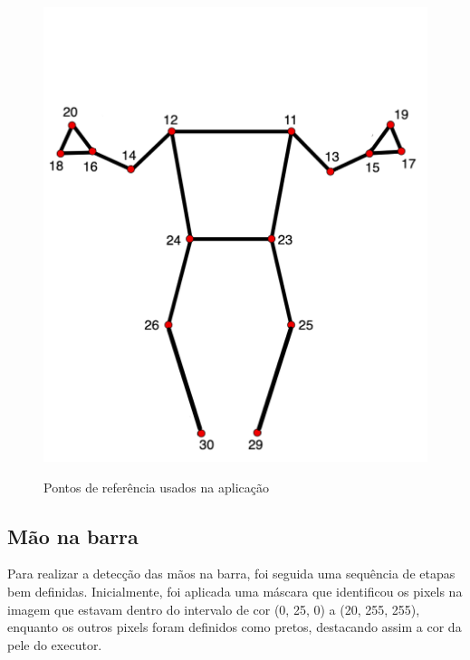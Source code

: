 \begin{figure}[H]
	\centering
	\caption{Pontos de referência usados na aplicação}
	\includegraphics[scale=0.2]{figuras/eph/pose_landmarks_custom.png}
	\label{fig:Pontos de referencia usados na aplicacao}
\end{figure}

\subsection[Mão na barra]{Mão na barra}\label{sec:Mao na barra}


Para realizar a detecção das mãos na barra, foi seguida uma sequência de etapas bem definidas. Inicialmente, foi aplicada uma máscara que identificou os pixels na imagem que estavam dentro do intervalo de cor (0, 25, 0) a (20, 255, 255), enquanto os outros pixels foram definidos como pretos, destacando assim a cor da pele do executor.

